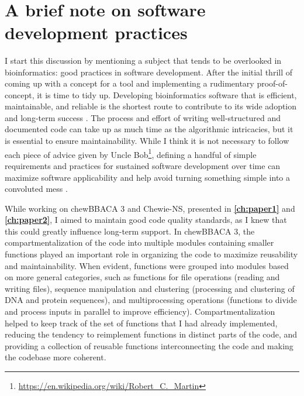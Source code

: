 \renewcommand*{\thefootnote}{\arabic{footnote}}

\mbox{}\\
\vspace{8cm}

\section{A brief note on software development practices}

I start this discussion by mentioning a subject that tends to be overlooked in bioinformatics: good practices in software development. After the initial thrill of coming up with a concept for a tool and implementing a rudimentary proof-of-concept, it is time to tidy up. Developing bioinformatics software that is efficient, maintainable, and reliable is the shortest route to contribute to its wide adoption and long-term success \cite{jimenez_four_2017, coelho_for_2024, black_ten_2020}. The process and effort of writing well-structured and documented code can take up as much time as the algorithmic intricacies, but it is essential to ensure maintainability. While I think it is not necessary to follow each piece of advice given by Uncle Bob\footnote{\url{https://en.wikipedia.org/wiki/Robert_C._Martin}}, defining a handful of simple requirements and practices for sustained software development over time can maximize software applicability and help avoid turning something simple into a convoluted mess \cite{gardner_sustained_2022}.

While working on chewBBACA 3 and \ac{Chewie-NS}, presented in \textbf{\autoref{ch:paper1}} and \textbf{\autoref{ch:paper2}}, I aimed to maintain good code quality standards, as I knew that this could greatly influence long-term support. In chewBBACA 3, the compartmentalization of the code into multiple modules containing smaller functions played an important role in organizing the code to maximize reusability and maintainability. When evident, functions were grouped into modules based on more general categories, such as functions for file operations (reading and writing files), sequence manipulation and clustering (processing and clustering of \ac{DNA} and protein sequences), and multiprocessing operations (functions to divide and process inputs in parallel to improve efficiency). Compartmentalization helped to keep track of the set of functions that I had already implemented, reducing the tendency to reimplement functions in distinct parts of the code, and providing a collection of reusable functions interconnecting the code and making the codebase more coherent.


